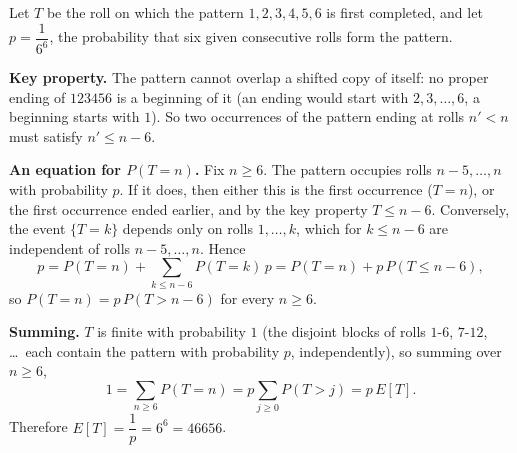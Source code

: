 Let $T$ be the roll on which the pattern $1,2,3,4,5,6$ is first completed, and let $p=\dfrac{1}{6^6}$, the probability that six given consecutive rolls form the pattern.

\textbf{Key property.} The pattern cannot overlap a shifted copy of itself: no proper ending of $123456$ is a beginning of it (an ending would start with $2,3,\dots,6$, a beginning starts with $1$). So two occurrences of the pattern ending at rolls $n'<n$ must satisfy $n'\le n-6$.

\textbf{An equation for $P(T=n)$.} Fix $n\ge6$. The pattern occupies rolls $n-5,\dots,n$ with probability $p$. If it does, then either this is the first occurrence ($T=n$), or the first occurrence ended earlier, and by the key property $T\le n-6$. Conversely, the event $\{T=k\}$ depends only on rolls $1,\dots,k$, which for $k\le n-6$ are independent of rolls $n-5,\dots,n$. Hence
\[
p=P(T=n)+\sum_{k\le n-6}P(T=k)\,p=P(T=n)+p\,P(T\le n-6),
\]
so $P(T=n)=p\,P(T>n-6)$ for every $n\ge6$.

\textbf{Summing.} $T$ is finite with probability $1$ (the disjoint blocks of rolls $1$-$6$, $7$-$12$, \dots\ each contain the pattern with probability $p$, independently), so summing over $n\ge6$,
\[
1=\sum_{n\ge6}P(T=n)=p\sum_{j\ge0}P(T>j)=p\,E[T].
\]
Therefore $E[T]=\dfrac{1}{p}=6^6=\boxed{46656}$.
